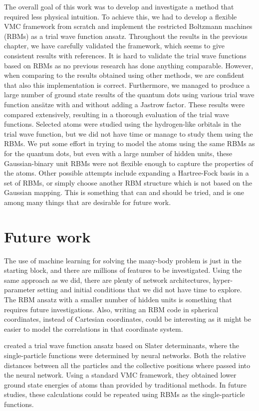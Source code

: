 The overall goal of this work was to develop and investigate a method that required less physical intuition. To achieve this, we had to develop a flexible VMC framework from scratch and implement the restricted Boltzmann machines (RBMs) as a trial wave function ansatz. Throughout the results in the previous chapter, we have carefully validated the framework, which seems to give consistent results with references. It is hard to validate the trial wave functions based on RBMs as no previous research has done anything comparable. However, when comparing to the results obtained using other methods, we are confident that also this implementation is correct. Furthermore, we managed to produce a large number of ground state results of the quantum dots using various trial wave function ansätze with and without adding a Jastrow factor. These results were compared extensively, resulting in a thorough evaluation of the trial wave functions. Selected atoms were studied using the hydrogen-like orbitals in the trial wave function, but we did not have time or manage to study them using the RBMs. We put some effort in trying to model the atoms using the same RBMs as for the quantum dots, but even with a large number of hidden units, these Gaussian-binary unit RBMs were not flexible enough to capture the properties of the atoms. Other possible attempts include expanding a Hartree-Fock basis in a set of RBMs, or simply choose another RBM structure which is not based on the Gaussian mapping. This is something that can and should be tried, and is one among many things that are desirable for future work.

\section*{Future work}
The use of machine learning for solving the many-body problem is just in the starting block, and there are millions of features to be investigated. Using the same approach as we did, there are plenty of network architectures, hyper-parameter setting and initial conditions that we did not have time to explore. The RBM ansatz with a smaller number of hidden units is something that requires future investigations. Also, writing an RBM code in spherical coordinates, instead of Cartesian coordinates, could be interesting as it might be easier to model the correlations in that coordinate system.

\citet{pfau2019abinitio} created a trial wave function ansatz based on Slater determinants, where the single-particle functions were determined by neural networks. Both the relative distances between all the particles and the collective positions where passed into the neural network. Using a standard VMC framework, they obtained lower ground state energies of atoms than provided by traditional methods. In future studies, these calculations could be repeated using RBMs as the single-particle functions.

